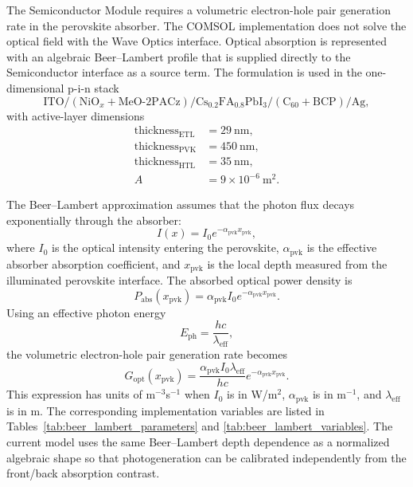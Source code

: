 The Semiconductor Module requires a volumetric electron-hole pair generation
rate in the perovskite absorber. The COMSOL implementation does not solve the
optical field with the Wave Optics interface. Optical absorption is represented
with an algebraic Beer--Lambert profile that is supplied directly to the
Semiconductor interface as a source term. The formulation is used in the
one-dimensional p-i-n stack
\begin{equation}
\mathrm{ITO}/(\mathrm{NiO}_x+\mathrm{MeO\mbox{-}2PACz})/
\mathrm{Cs}_{0.2}\mathrm{FA}_{0.8}\mathrm{PbI}_3/
(\mathrm{C}_{60}+\mathrm{BCP})/\mathrm{Ag},
\end{equation}
with active-layer dimensions
\begin{align}
\mathrm{thickness}_{\mathrm{ETL}} &= 29~\mathrm{nm},\\
\mathrm{thickness}_{\mathrm{PVK}} &= 450~\mathrm{nm},\\
\mathrm{thickness}_{\mathrm{HTL}} &= 35~\mathrm{nm},\\
A &= 9\times10^{-6}~\mathrm{m^2}.
\end{align}

The Beer--Lambert approximation assumes that the photon flux decays
exponentially through the absorber:
\begin{equation}
I(x)=I_0 e^{-\alpha_{\mathrm{pvk}}x_{\mathrm{pvk}}},
\end{equation}
where $I_0$ is the optical intensity entering the perovskite,
$\alpha_{\mathrm{pvk}}$ is the effective absorber absorption coefficient, and
$x_{\mathrm{pvk}}$ is the local depth measured from the illuminated
perovskite interface. The absorbed optical power density is
\begin{equation}
P_{\mathrm{abs}}(x_{\mathrm{pvk}})
=\alpha_{\mathrm{pvk}} I_0 e^{-\alpha_{\mathrm{pvk}}x_{\mathrm{pvk}}}.
\end{equation}
Using an effective photon energy
\begin{equation}
E_{\mathrm{ph}}=\frac{hc}{\lambda_{\mathrm{eff}}},
\end{equation}
the volumetric electron-hole pair generation rate becomes
\begin{equation}
G_{\mathrm{opt}}(x_{\mathrm{pvk}})
=\frac{\alpha_{\mathrm{pvk}}I_0\lambda_{\mathrm{eff}}}{hc}
e^{-\alpha_{\mathrm{pvk}}x_{\mathrm{pvk}}}.
\label{eq:beer_lambert_physical}
\end{equation}
This expression has units of m$^{-3}$s$^{-1}$ when $I_0$ is in W/m$^2$,
$\alpha_{\mathrm{pvk}}$ is in m$^{-1}$, and $\lambda_{\mathrm{eff}}$ is in m.
The corresponding implementation variables are listed in
Tables~\ref{tab:beer_lambert_parameters} and
\ref{tab:beer_lambert_variables}. The current model uses the same
Beer--Lambert depth dependence as a normalized algebraic shape so that
photogeneration can be calibrated independently from the front/back absorption
contrast.

